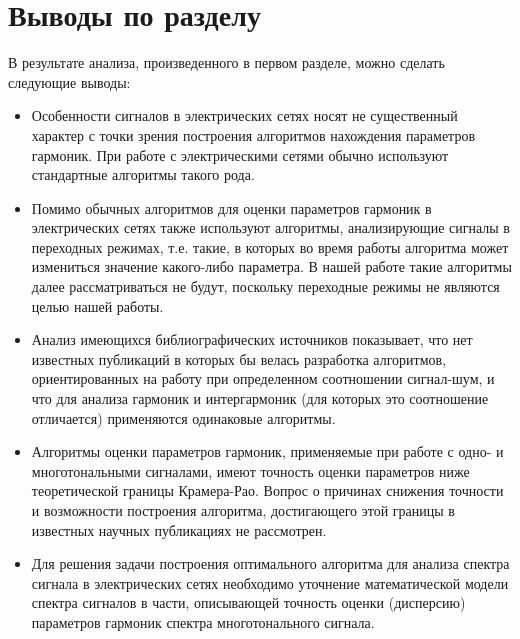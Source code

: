 \section{Выводы по разделу} \label{sec:ch1/sec7} 
В результате анализа, произведенного в первом разделе, можно сделать следующие выводы:
\begin{itemize}
	\item Особенности сигналов в электрических сетях носят не существенный характер с точки зрения построения алгоритмов нахождения параметров гармоник. При работе с электрическими сетями обычно используют стандартные алгоритмы такого рода.
	
	\item Помимо обычных алгоритмов для оценки параметров гармоник в электрических сетях также используют алгоритмы, анализирующие сигналы в переходных режимах, т.е. такие, в которых во время работы алгоритма может измениться значение какого-либо параметра. В нашей работе такие алгоритмы далее рассматриваться не будут, поскольку переходные режимы не являются целью нашей работы.
	
	\item Анализ имеющихся библиографических источников показывает, что нет известных публикаций в которых бы велась разработка алгоритмов, ориентированных на работу при определенном соотношении сигнал-шум, и что для анализа гармоник и интергармоник (для которых это соотношение отличается) применяются одинаковые алгоритмы.
	
	\item Алгоритмы оценки параметров гармоник, применяемые при работе с одно- и многотональными сигналами, имеют точность оценки параметров ниже теоретической границы Крамера-Рао. Вопрос о причинах снижения точности и возможности построения алгоритма, достигающего этой границы в известных научных публикациях не рассмотрен.
	
	\item Для решения задачи построения оптимального алгоритма для анализа спектра сигнала в электрических сетях необходимо уточнение математической модели спектра сигналов в части, описывающей точность оценки (дисперсию) параметров гармоник спектра многотонального сигнала.
\end{itemize}

